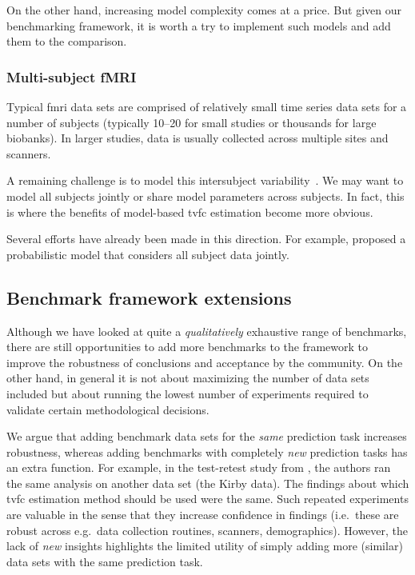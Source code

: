 On the other hand, increasing model complexity comes at a price.
But given our benchmarking framework, it is worth a try to implement such models and add them to the comparison.

\subsubsection{Multi-subject fMRI}

Typical \gls{fmri} data sets are comprised of relatively small time series data sets for a number of subjects (typically 10--20 for small studies or thousands for large biobanks).
In larger studies, data is usually collected across multiple sites and scanners.

A remaining challenge is to model this intersubject variability~\parencite{Allen2012}.
We may want to model all subjects jointly or share model parameters across subjects.
In fact, this is where the benefits of model-based \gls{tvfc} estimation become more obvious.

Several efforts have already been made in this direction.
For example, \textcite{Ebrahimi2020} proposed a probabilistic model that considers all subject data jointly.

\subsection{Benchmark framework extensions}\label{subsec:benchmark-framework-extensions}

Although we have looked at quite a \emph{qualitatively} exhaustive range of benchmarks, there are still opportunities to add more benchmarks to the framework to improve the robustness of conclusions and acceptance by the community.
On the other hand, in general it is not about maximizing the number of data sets included but about running the lowest number of experiments required to validate certain methodological decisions.

We argue that adding benchmark data sets for the \emph{same} prediction task increases robustness, whereas adding benchmarks with completely \emph{new} prediction tasks has an extra function.
%
For example, in the test-retest study from \textcite{Choe2017}, the authors ran the same analysis on another data set (the Kirby data).
The findings about which \gls{tvfc} estimation method should be used were the same.
Such repeated experiments are valuable in the sense that they increase confidence in findings (i.e.~these are robust across e.g.~data collection routines, scanners, demographics).
However, the lack of \emph{new} insights highlights the limited utility of simply adding more (similar) data sets with the same prediction task.

